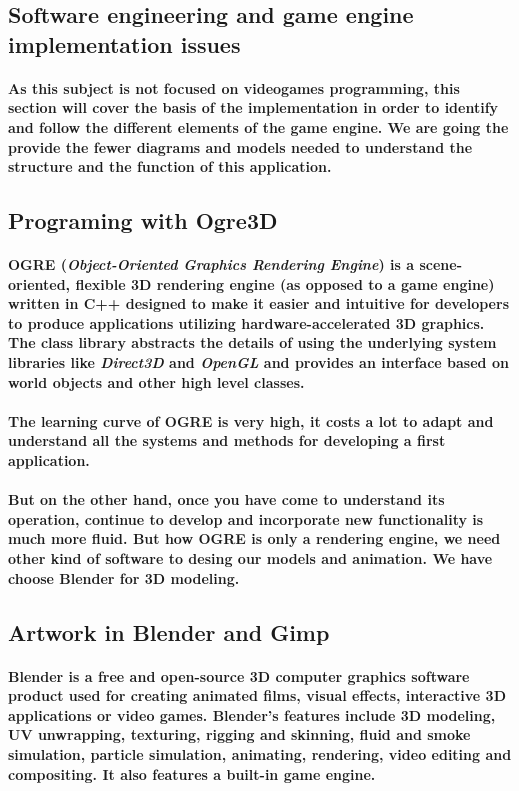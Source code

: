 \documentclass[a4paper,10pt]{article}
\newcommand{\p}[1]{\paragraph{\indent\textnormal{#1}}}
\begin{document}
  \subsection{Software engineering and game engine implementation issues}

    \p{As this subject is not focused on videogames programming, this section will cover the basis of the implementation in order to identify and follow the different elements of the game engine. We are going the provide the fewer diagrams and models needed to understand the structure and the function of this application.}


  \subsection{Programing with Ogre3D}

    \p{\textbf{OGRE} (\textit{Object-Oriented Graphics Rendering Engine}) is a scene-oriented, flexible 3D rendering engine (as opposed to a game engine) written in \textbf{C++} designed to make it easier and intuitive for developers to produce applications utilizing hardware-accelerated 3D graphics. The class library abstracts the details of using the underlying system libraries like \textit{Direct3D} and \textit{OpenGL} and provides an interface based on world objects and other high level classes.}

    \p{The learning curve of OGRE is very high, it costs a lot to adapt and understand all the systems and methods for developing a first application.}

    \p{But on the other hand, once you have come to understand its operation, continue to develop and incorporate new functionality is much more fluid. But how OGRE is only a rendering engine, we need other kind of software to desing our models and animation. We have choose Blender for 3D modeling.}

  \subsection{Artwork in Blender and Gimp}

    \p{\textbf{Blender} is a free and open-source 3D computer graphics software product used for creating animated films, visual effects, interactive 3D applications or video games. Blender's features include 3D modeling, UV unwrapping, texturing, rigging and skinning, fluid and smoke simulation, particle simulation, animating, rendering, video editing and compositing. It also features a built-in game engine.}
\end{document}
